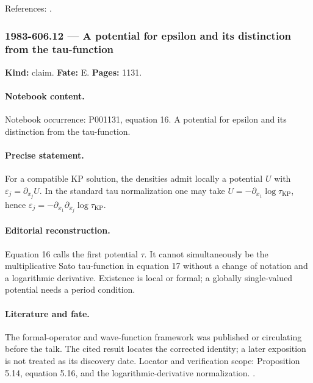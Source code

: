 \noindent References: \citep{cherednik1978differential,segalwilson1985loop}.\par

\subsubsection{1983-606.12 --- A potential for epsilon and its distinction from the tau-function}

\label{item:1983-606.12}

\noindent\textbf{Kind:} claim. \textbf{Fate:} E. \textbf{Pages:} 1131.\par

\paragraph{Notebook content.} Notebook occurrence: P001131, equation 16. A potential for epsilon and its distinction from the tau-function.

\paragraph{Precise statement.} For a compatible KP solution, the densities admit locally a potential \(U\) with \(\varepsilon_j=\partial_{x_j}U\). In the standard tau normalization one may take \(U=-\partial_{x_1}\log\tau_{\mathrm{KP}}\), hence \(\varepsilon_j=-\partial_{x_1}\partial_{x_j}\log\tau_{\mathrm{KP}}\).

\paragraph{Editorial reconstruction.} Equation 16 calls the first potential \(\tau\). It cannot simultaneously be the multiplicative Sato tau-function in equation 17 without a change of notation and a logarithmic derivative. Existence is local or formal; a globally single-valued potential needs a period condition.

\paragraph{Literature and fate.} The formal-operator and wave-function framework was published or circulating before the talk. The cited result locates the corrected identity; a later exposition is not treated as its discovery date. Locator and verification scope: Proposition 5.14, equation 5.16, and the logarithmic-derivative normalization. \cite{segalwilson1985loop}.

